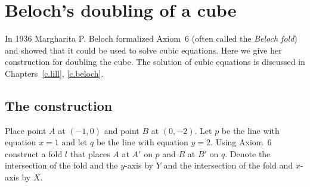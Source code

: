 \newpage

\section{Beloch's doubling of a cube}\label{s.cube2}

In 1936 Margharita P. Beloch formalized Axiom~6 (often called the \emph{Beloch fold}) and showed that it could be used to solve cubic equations. Here we give her construction for doubling the cube. The solution of cubic equations is discussed in Chapters~\ref{c.lill}, \ref{c.beloch}.

\subsection{The construction}

Place point $A$ at $(-1,0)$ and point $B$ at $(0,-2)$. Let $p$ be the line with equation $x=1$ and let $q$ be the line with equation $y=2$. Using Axiom~6 construct a fold $l$ that places $A$ at $A'$ on $p$ and $B$ at $B'$ on $q$. Denote the intersection of the fold and the $y$-axis by $Y$ and the intersection of the fold and $x$-axis by $X$.

